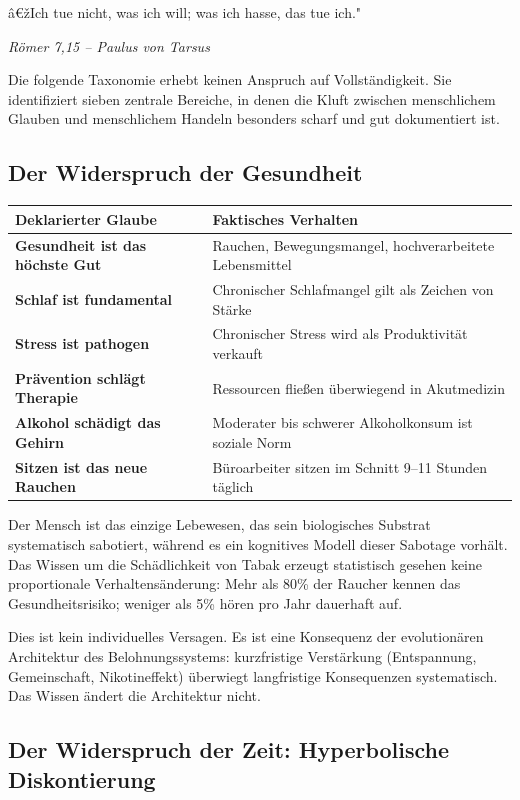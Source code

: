 ﻿\documentclass[12pt, a4paper]{article}
\begin{document}
\epigraph{â€žIch tue nicht, was ich will; was ich hasse, das tue ich."}%
{\textit{Römer 7,15 -- Paulus von Tarsus}}

Die folgende Taxonomie erhebt keinen Anspruch auf Vollständigkeit. Sie
identifiziert sieben zentrale Bereiche, in denen die Kluft zwischen menschlichem
Glauben und menschlichem Handeln besonders scharf und gut dokumentiert ist.

\subsection{Der Widerspruch der Gesundheit}

\medskip
\begin{tabular}{>{\bfseries}p{5cm} p{8cm}}
\toprule
Deklarierter Glaube & Faktisches Verhalten \\
\midrule
Gesundheit ist das höchste Gut & Rauchen, Bewegungsmangel, hochverarbeitete Lebensmittel \\
Schlaf ist fundamental & Chronischer Schlafmangel gilt als Zeichen von Stärke \\
Stress ist pathogen & Chronischer Stress wird als Produktivität verkauft \\
Prävention schlägt Therapie & Ressourcen fließen überwiegend in Akutmedizin \\
Alkohol schädigt das Gehirn & Moderater bis schwerer Alkoholkonsum ist soziale Norm \\
Sitzen ist das neue Rauchen & Büroarbeiter sitzen im Schnitt 9--11 Stunden täglich \\
\bottomrule
\end{tabular}
\medskip

Der Mensch ist das einzige Lebewesen, das sein biologisches Substrat systematisch
sabotiert, während es ein kognitives Modell dieser Sabotage vorhält. Das Wissen
um die Schädlichkeit von Tabak erzeugt statistisch gesehen keine proportionale
Verhaltensänderung: Mehr als 80\% der Raucher kennen das Gesundheitsrisiko;
weniger als 5\% hören pro Jahr dauerhaft auf.

Dies ist kein individuelles Versagen. Es ist eine Konsequenz der evolutionären
Architektur des Belohnungssystems: kurzfristige Verstärkung (Entspannung,
Gemeinschaft, Nikotineffekt) überwiegt langfristige Konsequenzen systematisch.
Das Wissen ändert die Architektur nicht.

\subsection{Der Widerspruch der Zeit: Hyperbolische Diskontierung}
\end{document}
